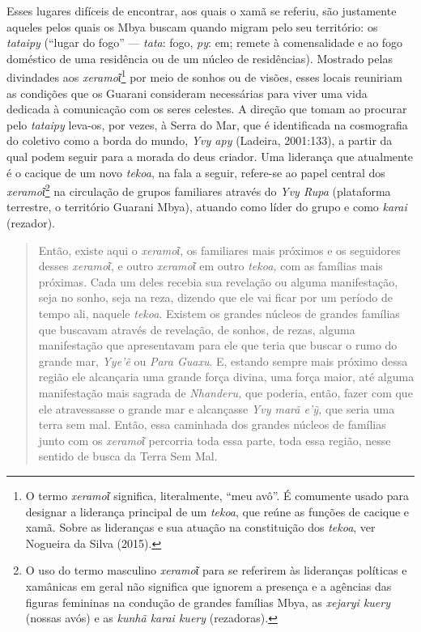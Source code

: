 Esses lugares difíceis de encontrar, aos quais o xamã se referiu, são
justamente aqueles pelos quais os Mbya buscam quando migram pelo seu
território: os \emph{tataipy} (``lugar do fogo'' --- \emph{tata}: fogo,
\emph{py}: em; remete à comensalidade e ao fogo doméstico de uma
residência ou de um núcleo de residências). Mostrado pelas divindades
aos \emph{xeramoῖ}\footnote{O termo \emph{xeramoῖ} significa,
  literalmente, ``meu avô''. É comumente usado para designar a liderança
  principal de um \emph{tekoa}, que reúne as funções de cacique e xamã.
  Sobre as lideranças e sua atuação na constituição dos \emph{tekoa},
  ver Nogueira da Silva (2015).} por meio de sonhos ou de visões, esses
locais reuniriam as condições que os Guarani consideram necessárias para
viver uma vida dedicada à comunicação com os seres celestes. A direção
que tomam ao procurar pelo \emph{tataipy} leva-os, por vezes, à Serra do
Mar, que é identificada na cosmografia do coletivo como a borda do
mundo, \emph{Yvy apy} (Ladeira, 2001:133), a partir da qual podem seguir
para a morada do deus criador. Uma liderança que atualmente é o cacique
de um novo \emph{tekoa}, na fala a seguir, refere-se ao papel central
dos \emph{xeramoῖ}\footnote{O uso do termo masculino \emph{xeramoῖ} para
  se referirem às lideranças políticas e xamânicas em geral não
  significa que ignorem a presença e a agências das figuras femininas na
  condução de grandes famílias Mbya, as \emph{xejaryi kuery} (nossas
  avós) e as \emph{kunhã karai kuery} (rezadoras).} na circulação de
grupos familiares através do \emph{Yvy Rupa} (plataforma terrestre, o
território Guarani Mbya), atuando como líder do grupo e como
\emph{karai} (rezador).

\begin{quote}
Então, existe aqui o \emph{xeramoῖ}, os familiares mais próximos e os
seguidores desses \emph{xeramoῖ}, e outro \emph{xeramoῖ} em outro
\emph{tekoa,} com as famílias mais próximas. Cada um deles recebia sua
revelação ou alguma manifestação, seja no sonho, seja na reza, dizendo
que ele vai ficar por um período de tempo ali, naquele \emph{tekoa}.
Existem os grandes núcleos de grandes famílias que buscavam através de
revelação, de sonhos, de rezas, alguma manifestação que apresentavam
para ele que teria que buscar o rumo do grande mar, \emph{Yye'ẽ} ou
\emph{Para Guaxu}. E, estando sempre mais próximo dessa região ele
alcançaria uma grande força divina, uma força maior, até alguma
manifestação mais sagrada de \emph{Nhanderu,} que poderia, então, fazer
com que ele atravessasse o grande mar e alcançasse \emph{Yvy marã e'ỹ,}
que seria uma terra sem mal. Então, essa caminhada dos grandes núcleos
de famílias junto com os \emph{xeramoῖ} percorria toda essa parte, toda
essa região, nesse sentido de busca da Terra Sem Mal.
\end{quote}

